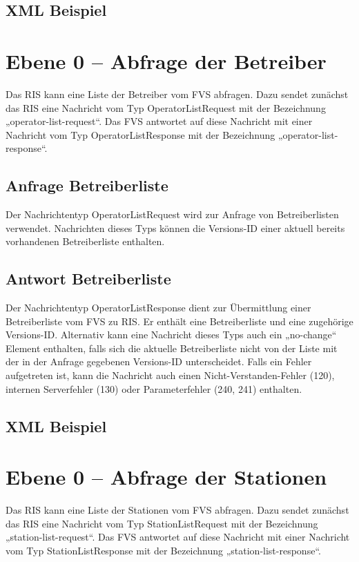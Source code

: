 \subsection{XML Beispiel}

\section{Ebene 0 -- Abfrage der Betreiber}
Das RIS kann eine Liste der Betreiber vom FVS abfragen. Dazu sendet zunächst das RIS eine Nachricht vom Typ OperatorListRequest mit der Bezeichnung „operator-list-request“. Das FVS antwortet auf diese Nachricht mit einer Nachricht vom Typ OperatorListResponse mit der Bezeichnung „operator-list-response“.



\subsection{Anfrage Betreiberliste}
Der Nachrichtentyp OperatorListRequest wird zur Anfrage von Betreiberlisten verwendet. Nachrichten dieses Typs können die Versions-ID einer aktuell bereits vorhandenen Betreiberliste enthalten.



\subsection{Antwort Betreiberliste}
Der Nachrichtentyp OperatorListResponse dient zur Übermittlung einer Betreiberliste vom FVS zu RIS. Er enthält eine Betreiberliste und eine zugehörige Versions-ID. Alternativ kann eine Nachricht dieses Typs auch ein „no-change“ Element enthalten, falls sich die aktuelle Betreiberliste nicht von der Liste mit der in der Anfrage gegebenen Versions-ID  unterscheidet. Falls ein Fehler aufgetreten ist, kann die Nachricht auch einen Nicht-Verstanden-Fehler (120), internen Serverfehler (130) oder Parameterfehler (240, 241) enthalten.



\subsection{XML Beispiel}

\section{Ebene 0 -- Abfrage der Stationen}
Das RIS kann eine Liste der Stationen vom FVS abfragen. Dazu sendet zunächst das RIS eine Nachricht vom Typ StationListRequest mit der Bezeichnung „station-list-request“. Das FVS antwortet auf diese Nachricht mit einer Nachricht vom Typ StationListResponse mit der Bezeichnung „station-list-response“.

